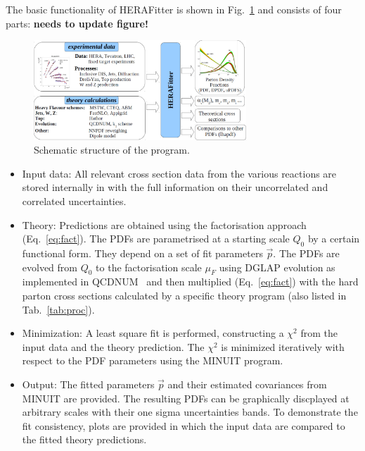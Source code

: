 The basic functionality of HERAFitter is shown in Fig.~\ref{fig:flow} and consists
of four parts: {\bf needs to update figure!}
\begin{figure}[!ht]
   \centering
   \includegraphics[width=8cm]{flow.pdf}
   \caption{Schematic structure of the \fitter program.} 
 \label{fig:flow}
\end{figure}
\begin{itemize}
\item 
Input data: All relevant cross section data from the various reactions
are stored internally in \fitter with the full information on their uncorrelated and correlated
uncertainties.
\item
    Theory: Predictions are obtained using the factorisation approach (Eq.~\ref{eq:fact}).
The PDFs are parametrised at a starting scale $Q_0$  by a certain functional form.
They depend on a set of fit parameters $\vec{p}$. 
The PDFs are  evolved from $Q_0$ to the factorisation scale $\mu_F$ using DGLAP evolution 
as implemented in QCDNUM~\cite{qcdnum} 
and then multiplied (Eq.~\ref{eq:fact}) with the hard parton cross sections calculated by
a specific theory program (also listed in Tab.~\ref{tab:proc}).
\item
Minimization: A least square fit is performed, constructing a 
$\chi^2$ from the input data and the theory prediction.
The $\chi^2$ is  minimized iteratively 
with respect to the PDF parameters using the MINUIT program.
%
%
\item
Output: The fitted parameters $\vec{p}$ and their estimated covariances
from MINUIT are provided.
The resulting PDFs can be graphically discplayed 
at arbitrary scales with their one sigma uncertainties bands.
%
To demonstrate the fit consistency, plots are provided 
in which the input data are compared to the fitted theory predictions.
\end{itemize}
%

